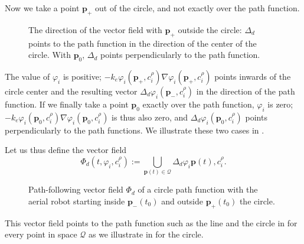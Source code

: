 Now we take a point $\mathbf{p}_{+}$ out of the circle, and not exactly over the path function. 
\begin{figure}[h!]
  \centering
  \selectfont
  
  \caption[Direction of the vector field outside and on the path function]{The direction of the vector field with $\mathbf{p}_{+}$ outside the circle: $\Delta_d$ points to the path function in the direction of the center of the circle. With $\mathbf{p}_{0}$, $\Delta_d$ points perpendicularly to the path function.}
  \label{fig:grad_gvf2}
\end{figure}
The value of $\varphi_i$ is positive; $-k_e\varphi_i(\mathbf{p}_{+},c_i^\rho)\nabla\varphi_i(\mathbf{p}_{+},c_i^\rho)$ points inwards of the circle center and the resulting vector $\Delta_d\varphi_i(\mathbf{p}_{-},c_i^\rho)$ in the direction of the path function. If we finally take a point $\mathbf{p}_{0}$ exactly over the path function, $\varphi_i$ is zero; $-k_e\varphi_i(\mathbf{p}_{0},c_i^\rho)\nabla\varphi_i(\mathbf{p}_{0},c_i^\rho)$ is thus also zero, and $\Delta_d\varphi_i(\mathbf{p}_{0},c_i^\rho)$ points perpendicularly to the path functions. We illustrate these two cases in . 

Let us thus define the vector field
\begin{equation}
  \varPhi_d(t,\varphi_i,c_i^\rho):=\bigcup\limits_{\mathbf{p}(t)\in\mathcal{Q}}{\Delta_d\varphi_i{\mathbf{p}(t),c_i^\rho}}.
\end{equation}

\begin{figure}[h!]
  \centering
  \selectfont
  
  \caption[Path-following vector field of a circle path function]{Path-following vector field $\varPhi_d$ of a circle path function with the aerial robot starting inside $\mathbf{p}_{-}(t_0)$ and outside $\mathbf{p}_{+}(t_0)$ the circle.}
  \label{fig:vecfs}
\end{figure}
This vector field points to the path function such as the line and the circle in  for every point in space $\mathcal{Q}$ as we illustrate in  for the circle.

